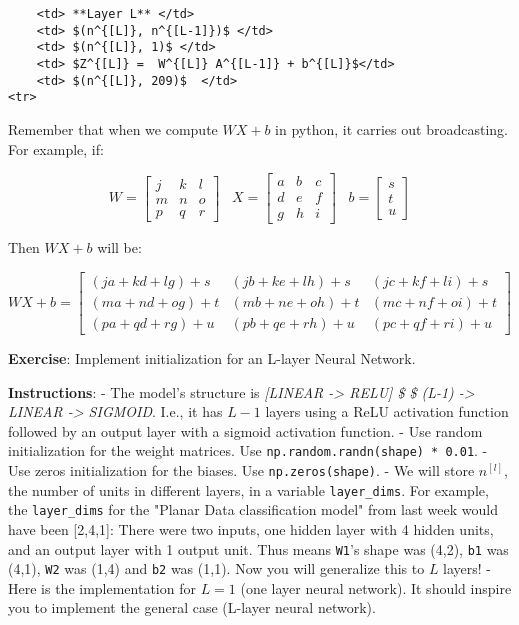 \documentclass[11pt]{article}
\begin{document}
\begin{verbatim}
    <td> **Layer L** </td> 
    <td> $(n^{[L]}, n^{[L-1]})$ </td> 
    <td> $(n^{[L]}, 1)$ </td>
    <td> $Z^{[L]} =  W^{[L]} A^{[L-1]} + b^{[L]}$</td>
    <td> $(n^{[L]}, 209)$  </td> 
<tr>
\end{verbatim}

Remember that when we compute \(W X + b\) in python, it carries out
broadcasting. For example, if:

\[ W = \begin{bmatrix}
    j  & k  & l\\
    m  & n & o \\
    p  & q & r 
\end{bmatrix}\;\;\; X = \begin{bmatrix}
    a  & b  & c\\
    d  & e & f \\
    g  & h & i 
\end{bmatrix} \;\;\; b =\begin{bmatrix}
    s  \\
    t  \\
    u
\end{bmatrix}\tag{2}\]

Then \(WX + b\) will be:

\[ WX + b = \begin{bmatrix}
    (ja + kd + lg) + s  & (jb + ke + lh) + s  & (jc + kf + li)+ s\\
    (ma + nd + og) + t & (mb + ne + oh) + t & (mc + nf + oi) + t\\
    (pa + qd + rg) + u & (pb + qe + rh) + u & (pc + qf + ri)+ u
\end{bmatrix}\tag{3}  \]

    \textbf{Exercise}: Implement initialization for an L-layer Neural
Network.

\textbf{Instructions}: - The model's structure is \emph{{[}LINEAR
-\textgreater{} RELU{]} \$ \times\$ (L-1) -\textgreater{} LINEAR
-\textgreater{} SIGMOID}. I.e., it has \(L-1\) layers using a ReLU
activation function followed by an output layer with a sigmoid
activation function. - Use random initialization for the weight
matrices. Use \texttt{np.random.randn(shape)\ *\ 0.01}. - Use zeros
initialization for the biases. Use \texttt{np.zeros(shape)}. - We will
store \(n^{[l]}\), the number of units in different layers, in a
variable \texttt{layer\_dims}. For example, the \texttt{layer\_dims} for
the "Planar Data classification model" from last week would have been
{[}2,4,1{]}: There were two inputs, one hidden layer with 4 hidden
units, and an output layer with 1 output unit. Thus means \texttt{W1}'s
shape was (4,2), \texttt{b1} was (4,1), \texttt{W2} was (1,4) and
\texttt{b2} was (1,1). Now you will generalize this to \(L\) layers! -
Here is the implementation for \(L=1\) (one layer neural network). It
should inspire you to implement the general case (L-layer neural
network).
\end{document}
